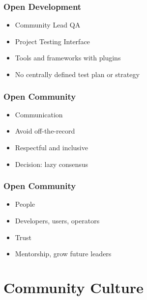\documentclass[aspectratio=169,11pt,hyperref={colorlinks=true}]{beamer}
\begin{document}
\begin{frame}
  \frametitle{Open Development}
    \begin{itemize}
        \item{Community Lead QA}
        \item{Project Testing Interface}
        \item{Tools and frameworks with plugins}
        \item{No centrally defined test plan or strategy}
    \end{itemize}
\end{frame}

\begin{frame}
  \frametitle{Open Community}
    \begin{itemize}
        \item{Communication}
        \item{Avoid off-the-record}
        \item{Respectful and inclusive}
        \item{Decision: lazy consensus}
    \end{itemize}
\end{frame}

\begin{frame}
  \frametitle{Open Community}
    \begin{itemize}
        \item{People}
        \item{Developers, users, operators}
        \item{Trust}
        \item{Mentorship, grow future leaders}
    \end{itemize}
\end{frame}

\section{Community Culture}

\end{document}
